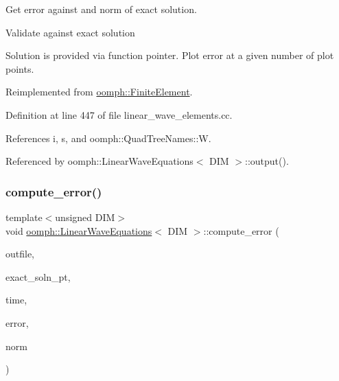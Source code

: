 Get error against and norm of exact solution. 

Validate against exact solution

Solution is provided via function pointer. Plot error at a given number of plot points. 

Reimplemented from \hyperlink{classoomph_1_1FiniteElement_a73c79a1f1e5b1d334757812a6bbd58ff}{oomph\+::\+Finite\+Element}.



Definition at line 447 of file linear\+\_\+wave\+\_\+elements.\+cc.



References i, s, and oomph\+::\+Quad\+Tree\+Names\+::W.



Referenced by oomph\+::\+Linear\+Wave\+Equations$<$ D\+I\+M $>$\+::output().

\mbox{\label{classoomph_1_1LinearWaveEquations_ae2dedf5d1dc024da927b05f532dde540}} 
\subsubsection{\texorpdfstring{compute\+\_\+error()}{compute\_error()}\hspace{0.1cm}{\footnotesize\ttfamily [2/2]}}
{\footnotesize\ttfamily template$<$unsigned D\+IM$>$ \\
void \hyperlink{classoomph_1_1LinearWaveEquations}{oomph\+::\+Linear\+Wave\+Equations}$<$ D\+IM $>$\+::compute\+\_\+error (\begin{DoxyParamCaption}\item[{std\+::ostream \&}]{outfile,  }\item[{\hyperlink{classoomph_1_1FiniteElement_ad4ecf2b61b158a4b4d351a60d23c633e}{Finite\+Element\+::\+Unsteady\+Exact\+Solution\+Fct\+Pt}}]{exact\+\_\+soln\+\_\+pt,  }\item[{const double \&}]{time,  }\item[{double \&}]{error,  }\item[{double \&}]{norm }\end{DoxyParamCaption})\hspace{0.3cm}{\ttfamily [virtual]}}



